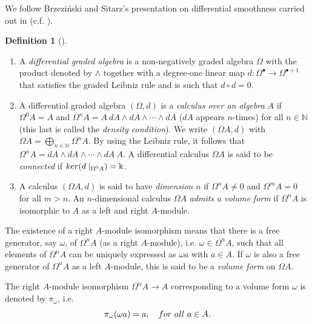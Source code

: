 \documentclass{amsart}
\theoremstyle{definition}
\newtheorem{definition}[theorem]{Definition}
\theoremstyle{remark}
\numberwithin{equation}{section}
\begin{document}
We follow Brzezi\'nski and Sitarz's presentation on differential smoothness carried out in \cite[Section 2]{BrzezinskiSitarz2017} (c.f. \cite{Brzezinski2008, Brzezinski2014}).

\begin{definition}[{\cite[Section 2.1]{BrzezinskiSitarz2017}}]
\begin{enumerate}
    \item [\rm (i)] A {\em differential graded algebra} is a non-negatively graded algebra $\Omega$ with the product denoted by $\wedge$ together with a degree-one linear map $d:\Omega^{\bullet} \to \Omega^{\bullet +1}$ that satisfies the graded Leibniz rule and is such that $d \circ d = 0$. 
    
    \item [\rm (ii)] A differential graded algebra $(\Omega, d)$ is a {\em calculus over an algebra} $A$ if $\Omega^0 A = A$ and $\Omega^n A = A\ dA \wedge dA \wedge \dotsb \wedge dA$ ($dA$ appears $n$-times) for all $n\in \mathbb{N}$ (this last is called the {\em density condition}). We write $(\Omega A, d)$ with $\Omega A = \bigoplus_{n\in \mathbb{N}} \Omega^{n}A$. By using the Leibniz rule, it follows that $\Omega^n A = dA \wedge dA \wedge \dotsb \wedge dA\ A$. A differential calculus $\Omega A$ is said to be {\em connected} if ${\rm ker}(d\mid_{\Omega^0 A}) = \Bbbk$.
    
    \item [\rm (iii)] A calculus $(\Omega A, d)$ is said to have {\em dimension} $n$ if $\Omega^n A\neq 0$ and $\Omega^m A = 0$ for all $m > n$. An $n$-dimensional calculus $\Omega A$ {\em admits a volume form} if $\Omega^n A$ is isomorphic to $A$ as a left and right $A$-module. 
\end{enumerate}
\end{definition}

The existence of a right $A$-module isomorphism means that there is a free generator, say $\omega$, of $\Omega^n A$ (as a right $A$-module), i.e. $\omega \in \Omega^n A$, such that all elements of $\Omega^n A$ can be uniquely expressed as $\omega a$ with $a \in A$. If $\omega$ is also a free generator of $\Omega^n A$ as a left $A$-module, this is said to be a {\em volume form} on $\Omega A$.


The right $A$-module isomorphism $\Omega^n A \to A$ corresponding to a volume form $\omega$ is denoted by $\pi_{\omega}$, i.e.
\begin{equation}\label{BrzezinskiSitarz2017(2.1)}
\pi_{\omega} (\omega a) = a, \quad {\rm for\ all}\ a\in A.
\end{equation}
\end{document}
